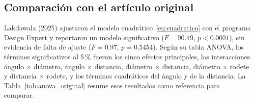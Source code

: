 \subsection{Comparación con el artículo original}

Lakdawala (2025) ajustaron el modelo cuadrático~\eqref{eq:cuadratico} con el programa Design Expert y reportaron un modelo significativo ($F = 90.49$, $p < 0.0001$), sin evidencia de falta de ajuste ($F = 0.97$, $p = 0.5454$). Según su tabla ANOVA, los términos significativos al 5\,\% fueron los cinco efectos principales, las interacciones ángulo $\times$ diámetro, ángulo $\times$ distancia, diámetro $\times$ distancia, diámetro $\times$ rodete y distancia $\times$ rodete, y los términos cuadráticos del ángulo y de la distancia. La Tabla~\ref{tab:anova_original} resume esos resultados como referencia para comparar.

